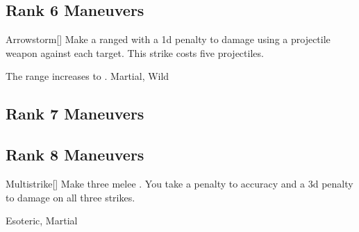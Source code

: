 \subsection{Rank 6 Maneuvers}

\lowercase{\hypertarget{maneuver:Arrowstorm}{}}\label{maneuver:Arrowstorm}
\hypertarget{maneuver:Arrowstorm}{}
\begin{freeability}[Rank 6]{Arrowstorm}[]
Make a ranged  with a \minus1d penalty to damage using a projectile weapon against each target.
This strike costs five projectiles.

\rankline
{} The range increases to \rnglong.
 Martial, Wild
\end{freeability}
\vspace{0.25em}


\subsection{Rank 7 Maneuvers}
\subsection{Rank 8 Maneuvers}

\lowercase{\hypertarget{maneuver:Multistrike}{}}\label{maneuver:Multistrike}
\hypertarget{maneuver:Multistrike}{}
\begin{freeability}[Rank 8]{Multistrike}[]
Make three melee .
You take a  penalty to accuracy and a \minus3d penalty to damage on all three strikes.


 Esoteric, Martial
\end{freeability}
\vspace{0.25em}

